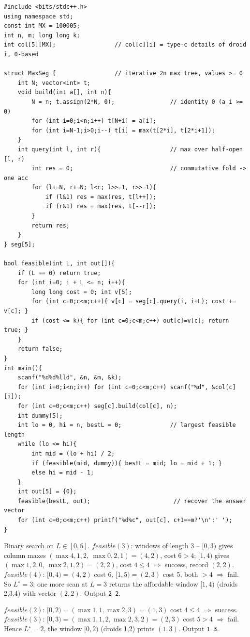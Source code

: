 \begin{lstlisting}[caption={CF 514D full solution: per-column iterative max-segtrees + binary search on length}, label={lst:c13-514-soln}]
#include <bits/stdc++.h>
using namespace std;
const int MX = 100005;
int n, m; long long k;
int col[5][MX];                 // col[c][i] = type-c details of droid i, 0-based

struct MaxSeg {                 // iterative 2n max tree, values >= 0
    int N; vector<int> t;
    void build(int a[], int n){
        N = n; t.assign(2*N, 0);                // identity 0 (a_i >= 0)
        for (int i=0;i<n;i++) t[N+i] = a[i];
        for (int i=N-1;i>0;i--) t[i] = max(t[2*i], t[2*i+1]);
    }
    int query(int l, int r){                    // max over half-open [l, r)
        int res = 0;                            // commutative fold -> one acc
        for (l+=N, r+=N; l<r; l>>=1, r>>=1){
            if (l&1) res = max(res, t[l++]);
            if (r&1) res = max(res, t[--r]);
        }
        return res;
    }
} seg[5];

bool feasible(int L, int out[]){
    if (L == 0) return true;
    for (int i=0; i + L <= n; i++){
        long long cost = 0; int v[5];
        for (int c=0;c<m;c++){ v[c] = seg[c].query(i, i+L); cost += v[c]; }
        if (cost <= k){ for (int c=0;c<m;c++) out[c]=v[c]; return true; }
    }
    return false;
}
int main(){
    scanf("%d%d%lld", &n, &m, &k);
    for (int i=0;i<n;i++) for (int c=0;c<m;c++) scanf("%d", &col[c][i]);
    for (int c=0;c<m;c++) seg[c].build(col[c], n);
    int dummy[5];
    int lo = 0, hi = n, bestL = 0;              // largest feasible length
    while (lo <= hi){
        int mid = (lo + hi) / 2;
        if (feasible(mid, dummy)){ bestL = mid; lo = mid + 1; }
        else hi = mid - 1;
    }
    int out[5] = {0};
    feasible(bestL, out);                        // recover the answer vector
    for (int c=0;c<m;c++) printf("%d%c", out[c], c+1==m?'\n':' ');
}
\end{lstlisting}

\begin{tracebox}[CF 514D sample 1: n=5, m=2, k=4]
Binary search on \(L\in[0,5]\).  \(\mathit{feasible}(3)\): windows of length 3 --
\([0,3)\) gives column maxes \((\max 4,1,2,\ \max 0,2,1)=(4,2)\), cost \(6>4\);
\([1,4)\) gives \((\max 1,2,0,\ \max 2,1,2)=(2,2)\), cost \(4\le4\) \(\Rightarrow\)
success, record \((2,2)\).  \(\mathit{feasible}(4)\): \([0,4)=(4,2)\) cost 6,
\([1,5)=(2,3)\) cost 5, both \(>4\) \(\Rightarrow\) fail.  So \(L^\star=3\); one
more scan at \(L=3\) returns the affordable window \([1,4)\) (droids 2,3,4) with
vector \((2,2)\).  Output \texttt{2 2}.
\end{tracebox}
\begin{tracebox}[CF 514D sample 2: n=3, m=2, k=4]
\(\mathit{feasible}(2)\): \([0,2)=(\max 1,1,\max 2,3)=(1,3)\) cost \(4\le4\)
\(\Rightarrow\) success.  \(\mathit{feasible}(3)\): \([0,3)=(\max 1,1,2,\max
2,3,2)=(2,3)\) cost \(5>4\) \(\Rightarrow\) fail.  Hence \(L^\star=2\), the window
\([0,2)\) (droids 1,2) prints \((1,3)\).  Output \texttt{1 3}.
\end{tracebox}

